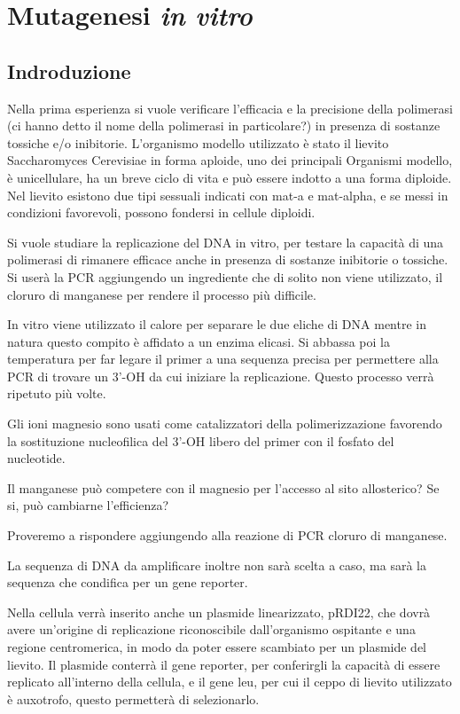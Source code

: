 \section*{Mutagenesi \emph{in vitro}}

	\subsection*{Indroduzione}

        Nella prima esperienza si vuole verificare l'efficacia e la precisione della polimerasi (ci hanno detto il nome della polimerasi in particolare?)
        in presenza di sostanze tossiche e/o inibitorie.
        L'organismo modello utilizzato è stato il lievito Saccharomyces Cerevisiae in forma aploide, uno dei principali Organismi modello, è unicellulare, ha un breve ciclo
        di vita e può essere indotto a una forma diploide. 
        Nel lievito esistono due tipi sessuali indicati con mat-a e mat-alpha, e se messi in condizioni favorevoli, possono fondersi in cellule diploidi.

        Si vuole studiare la replicazione del DNA in vitro, per testare la capacità di una polimerasi di rimanere efficace anche in presenza di sostanze inibitorie o tossiche.
        Si userà la PCR aggiungendo un ingrediente che di solito non viene utilizzato, il cloruro di manganese per rendere il processo più difficile.

        In vitro viene utilizzato il calore per separare le due eliche di DNA mentre in natura questo compito è affidato a un enzima elicasi. 
        Si abbassa poi la temperatura per far legare il primer a una sequenza precisa per permettere alla PCR di trovare un 3'-OH da cui iniziare la replicazione.
        Questo processo verrà ripetuto più volte.

        Gli ioni magnesio sono usati come catalizzatori della polimerizzazione favorendo la sostituzione nucleofilica del 3'-OH libero del primer con il fosfato del nucleotide.
        
        Il manganese può competere con il magnesio per l'accesso al sito allosterico? Se si, può cambiarne l'efficienza?

        Proveremo a rispondere aggiungendo alla reazione di PCR cloruro di manganese.

        La sequenza di DNA da amplificare inoltre non sarà scelta a caso, ma sarà la sequenza che condifica per un gene reporter.

        Nella cellula verrà inserito anche un plasmide linearizzato, pRDI22, che dovrà avere un'origine di replicazione riconoscibile dall'organismo ospitante e una regione
        centromerica, in modo da poter essere scambiato per un plasmide del lievito.
        Il plasmide conterrà il gene reporter, per conferirgli la capacità di essere replicato all'interno della cellula, e il gene leu, per cui il ceppo di lievito utilizzato
        è auxotrofo, questo permetterà di selezionarlo.

